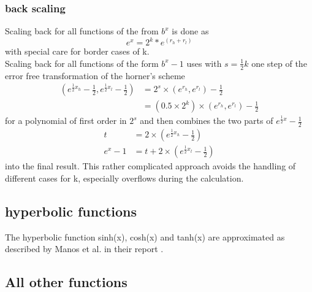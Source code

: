 \documentclass[10pt,a4paper,draft]{article}
\numberwithin{equation}{subsection}
\begin{document}
\subsubsection{back scaling}
    Scaling back for all functions of the from $b^x$ is done
    as
    \begin{equation}
        e ^ x = 2^k * e^{(r_h + r_l)}
    \end{equation}
    with special care for border cases of k.\\[10pt]
    Scaling back for all functions of the form $b^x-1$ uses
    with $ s  = \frac{1}{2} k $ one step of the error free
    transformation of the horner's scheme
    \begin{equation}
        \begin{aligned}
            (e^{\frac{1}{2}x_h}-\frac{1}{2}, e^{\frac{1}{2}x_l}-\frac{1}{2})
                &=
                    2^s \times (e^{r_h},e^{r_l}) - \frac{1}{2}\\
                &=
                    (0.5 \times 2^k) \times (e^{r_h},e^{r_l}) - \frac{1}{2}
        \end{aligned}
    \end{equation}
    for a polynomial of first order in $2^s$ and then combines the two parts
    of $ e^{\frac{1}{2}x} - \frac{1}{2} $
    \begin{equation}
        \begin{aligned}
        t &= 2 \times ( e^{\frac{1}{2}x_h} -\frac{1}{2} ) \\
        e ^ x -1 &= t + 2 \times (e^{\frac{1}{2}x_l} -\frac{1}{2})
        \end{aligned}
    \end{equation}
    into the final result. This rather complicated approach avoids the
    handling of different cases for k, especially overflows during the
    calculation.

\subsection{hyperbolic functions}

The hyperbolic function sinh(x), cosh(x) and tanh(x) are approximated as
described by Manos et al. in their report \cite{manos1972constrained}.

\subsection{All other functions}
\end{document}
